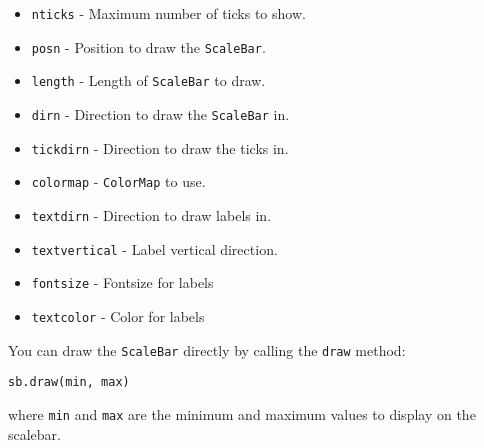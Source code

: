 \begin{itemize}

\item
  \texttt{nticks} - Maximum number of ticks to show.\\
\item
  \texttt{posn} - Position to draw the \texttt{ScaleBar}.
\item
  \texttt{length} - Length of \texttt{ScaleBar} to draw.
\item
  \texttt{dirn} - Direction to draw the \texttt{ScaleBar} in.
\item
  \texttt{tickdirn} - Direction to draw the ticks in.
\item
  \texttt{colormap} - \texttt{ColorMap} to use.
\item
  \texttt{textdirn} - Direction to draw labels in.
\item
  \texttt{textvertical} - Label vertical direction.
\item
  \texttt{fontsize} - Fontsize for labels
\item
  \texttt{textcolor} - Color for labels
\end{itemize}

You can draw the \texttt{ScaleBar} directly by calling the \texttt{draw}
method:

\begin{lstlisting}
sb.draw(min, max)
\end{lstlisting}

where \texttt{min} and \texttt{max} are the minimum and maximum values
to display on the scalebar.

